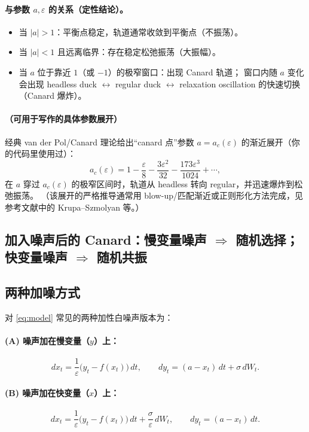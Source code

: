 \paragraph{与参数 $a,\varepsilon$ 的关系（定性结论）。}
\begin{itemize}
	\item 当 $|a|>1$：平衡点稳定，轨道通常收敛到平衡点（不振荡）。
	\item 当 $|a|<1$ 且远离临界：存在稳定松弛振荡（大振幅）。
	\item 当 $a$ 位于靠近 $1$（或 $-1$）的极窄窗口：出现 Canard 轨道；
	窗口内随 $a$ 变化会出现 headless duck $\leftrightarrow$ regular duck $\leftrightarrow$ relaxation oscillation 的快速切换（Canard 爆炸）。
\end{itemize}

\paragraph{（可用于写作的具体参数展开）}
经典 van der Pol/Canard 理论给出“canard 点”参数 $a=a_c(\varepsilon)$ 的渐近展开（你的代码里使用过）：
\[
a_c(\varepsilon)=1-\frac{\varepsilon}{8}-\frac{3\varepsilon^2}{32}-\frac{173\varepsilon^3}{1024}+\cdots,
\]
在 $a$ 穿过 $a_c(\varepsilon)$ 的极窄区间时，轨道从 headless 转向 regular，并迅速爆炸到松弛振荡。
（该展开的严格推导通常用 blow-up/匹配渐近或正则形化方法完成，见参考文献中的 Krupa--Szmolyan 等。）

\subsection{加入噪声后的 Canard：慢变量噪声 $\Rightarrow$ 随机选择；快变量噪声 $\Rightarrow$ 随机共振}

\subsection{两种加噪方式}
对 \eqref{eq:model} 常见的两种加性白噪声版本为：

\paragraph{(A) 噪声加在慢变量（$y$）上：}
\begin{equation}\label{eq:slow-noise}
	dx_t=\frac{1}{\varepsilon}\bigl(y_t-f(x_t)\bigr)\,dt,\qquad
	dy_t=(a-x_t)\,dt+\sigma\,dW_t .
\end{equation}

\paragraph{(B) 噪声加在快变量（$x$）上：}
\begin{equation}\label{eq:fast-noise}
	dx_t=\frac{1}{\varepsilon}\bigl(y_t-f(x_t)\bigr)\,dt+\frac{\sigma}{\varepsilon}\,dW_t,\qquad
	dy_t=(a-x_t)\,dt .
\end{equation}

